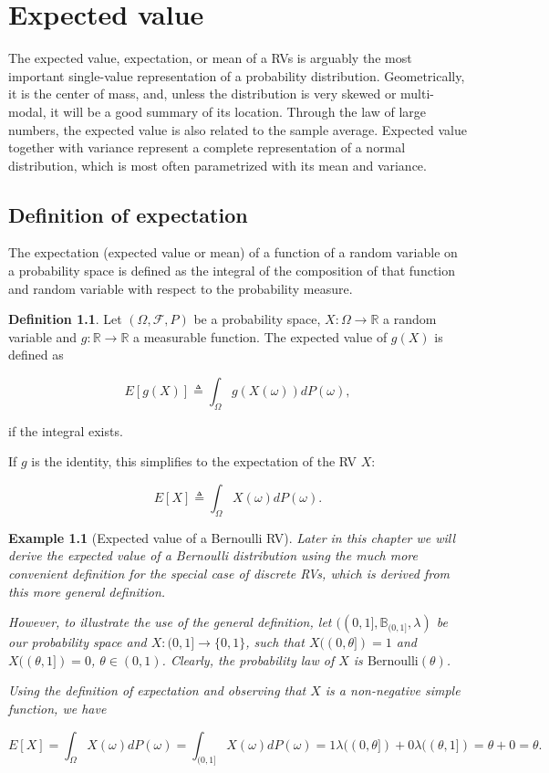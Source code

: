 \documentclass{book}
\theoremstyle{plain}%
\newtheorem{prototheorem}{Example}[section]
\newenvironment{cexample}
   {\colorlet{shadecolor}{gray!10}\begin{shaded}\begin{prototheorem}}
   {\end{prototheorem}\end{shaded}}
\theoremstyle{definition}
\newtheorem{definition}{Definition}[section]
\newlength{\arrow}
\begin{document}
\chapter{Expected value}

The expected value, expectation, or mean of a RVs is arguably the most important single-value representation of a probability distribution. Geometrically, it is the center of mass, and, unless the distribution is very skewed or multi-modal, it will be a good summary of its location. Through the law of large numbers, the expected value is also related to the sample average. Expected value together with variance represent a complete representation of a normal distribution, which is most often parametrized with its mean and variance.

\section{Definition of expectation}

The expectation (expected value or mean) of a function of a random variable on a probability space is defined as the integral of the composition of that function and random variable with respect to the probability measure.

\begin{definition}
Let $(\Omega, \mathcal{F}, P)$ be a probability space, $X: \Omega \rightarrow \mathbb{R}$ a random variable and $g: \mathbb{R} \rightarrow \mathbb{R}$ a measurable function. The expected value of $g(X)$ is defined as

$$E[g(X)] \triangleq \int_{\Omega} g(X(\omega))dP(\omega),$$

if the integral exists.

If $g$ is the identity, this simplifies to the expectation of the RV $X$:

$$E[X] \triangleq \int_{\Omega} X(\omega)dP(\omega).$$
\end{definition}

\begin{cexample}[Expected value of a Bernoulli RV]
Later in this chapter we will derive the expected value of a Bernoulli distribution using the much more convenient definition for the special case of discrete RVs, which is derived from this more general definition.

However, to illustrate the use of the general definition, let $((0,1], \mathbb{B}_{(0,1]}, \lambda)$ be our probability space and $X: (0,1] \rightarrow \{0,1\}$, such that $X((0,\theta]) = 1$ and  $X((\theta, 1]) = 0$, $\theta \in (0,1)$. Clearly, the probability law of $X$ is $\text{Bernoulli}(\theta)$.

Using the definition of expectation and observing that $X$ is a non-negative simple function, we have

$$E[X] = \int_{\Omega} X(\omega)dP(\omega) = \int_{(0,1]} X(\omega)dP(\omega) = 1\lambda((0,\theta]) + 0\lambda((\theta,1]) = \theta + 0 = \theta.$$
\end{cexample}
\end{document}
